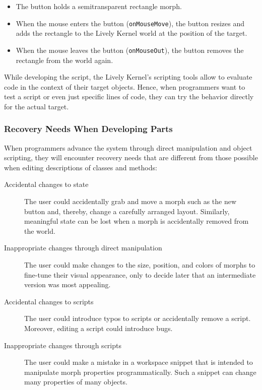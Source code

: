 \begin{itemize}
\item The button holds a semitransparent rectangle morph.
\item When the mouse enters the button (\lstinline{onMouseMove}), the
  button resizes and adds the rectangle to the Lively Kernel world at
  the position of the target.
\item When the mouse leaves the button (\lstinline{onMouseOut}), the
  button removes the rectangle from the world again.
\end{itemize}

While developing the script, the Lively Kernel's scripting tools allow
to evaluate code in the context of their target objects.  Hence, when
programmers want to test a script or even just specific lines of code,
they can try the behavior directly for the actual target.


\subsubsection{Recovery Needs When Developing Parts}

When programmers advance the system through direct manipulation and
object scripting, they will encounter recovery needs that are
different from those possible when editing descriptions of classes and
methods:

\begin{description}
\item[Accidental changes to state] The user could accidentally grab
  and move a morph such as the new button and, thereby, change a
  carefully arranged layout. Similarly, meaningful state can be lost
  when a morph is accidentally removed from the world.
\item[Inappropriate changes through direct manipulation] The user
  could make changes to the size, position, and colors of morphs to
  fine-tune their visual appearance, only to decide later that an
  intermediate version was most appealing.
\item[Accidental changes to scripts] The user could introduce typos
  to scripts or accidentally remove a script. Moreover, editing a
  script could introduce bugs.
\item[Inappropriate changes through scripts] The user could
  make a mistake in a workspace snippet that is intended to manipulate
  morph properties programmatically. Such a snippet can change many
  properties of many objects.
\end{description}

